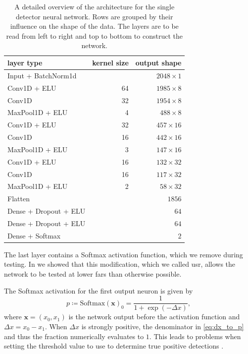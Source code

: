 \begin{table}[]
	\centering
    \caption[Network architecture]{A detailed overview of the architecture for the single detector neural network. Rows are grouped by their influence on the shape of the data. The layers are to be read from left to right and top to bottom to construct the network.}\label{tab:cnn_coinc_network}
    \begin{tabular}{lrr}
	    \hline\hline
        layer type & kernel size & output shape \\
        \hline
        Input + BatchNorm1d & & $2048\times 1$ \\
        Conv1D + ELU & 64 & $1985\times 8$ \\
        Conv1D & 32 & $1954\times 8$ \\
        MaxPool1D + ELU & 4 & $488\times 8$ \\
        Conv1D + ELU & 32 & $457\times 16$ \\
        Conv1D & 16 & $442\times 16$ \\
        MaxPool1D + ELU & 3 & $147\times 16$ \\
        Conv1D + ELU & 16 & $132\times 32$ \\
        Conv1D & 16 & $117\times 32$ \\
        MaxPool1D + ELU & 2 & $58\times 32$ \\
        Flatten & & $1856$ \\
        Dense + Dropout + ELU & & $64$ \\
        Dense + Dropout + ELU & & $64$ \\
        Dense + Softmax & & $2$ \\
        \hline\hline
    \end{tabular}
\end{table}

The last layer contains a Softmax activation function, which we remove during testing. In \cite{Schafer:2021fea} we showed that this modification, which we called \acrfull{usr}, allows the network to be tested at lower \acrshort{far}s than otherwise possible.

The Softmax activation for the first output neuron is given by
\begin{equation}\label{eq:dx_to_p}
p \coloneqq {\text{Softmax}\left(\bm{x}\right)}_0 = \frac{1}{1+\exp\left(-\Delta x\right)},
\end{equation}
where $\bm{x} = \left( x_0, x_1 \right)$ is the network output before the activation function and $\Delta x = x_0 - x_1$. When $\Delta x$ is strongly positive, the denominator in \eqref{eq:dx_to_p} and thus the fraction numerically evaluates to $1$. This leads to problems when setting the threshold value to use to determine true positive detections \cite{Schafer:2021fea}.

